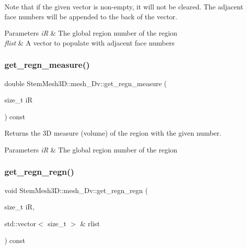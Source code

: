 Note that if the given vector is non-\/empty, it will not be cleared. The adjacent face numbers will be appended to the back of the vector. 
\begin{DoxyParams}{Parameters}
{\em iR} & The global region number of the region \\
\hline
{\em flist} & A vector to populate with adjacent face numbers \\
\hline
\end{DoxyParams}
\mbox{\label{classStemMesh3D_1_1mesh__3Dv_a1c784e3ea324d11e1ebd51574dcaabde}} 
\subsubsection{\texorpdfstring{get\+\_\+regn\+\_\+measure()}{get\_regn\_measure()}}
{\footnotesize\ttfamily double Stem\+Mesh3\+D\+::mesh\+\_\+Dv\+::get\+\_\+regn\+\_\+measure (\begin{DoxyParamCaption}\item[{size\+\_\+t}]{iR }\end{DoxyParamCaption}) const}



Returns the 3D measure (volume) of the region with the given number. 


\begin{DoxyParams}{Parameters}
{\em iR} & The global region number of the region \\
\hline
\end{DoxyParams}
\mbox{\label{classStemMesh3D_1_1mesh__3Dv_aae9d1d4fa2441cb2ac8e6a05f3e5038b}} 
\subsubsection{\texorpdfstring{get\+\_\+regn\+\_\+regn()}{get\_regn\_regn()}}
{\footnotesize\ttfamily void Stem\+Mesh3\+D\+::mesh\+\_\+Dv\+::get\+\_\+regn\+\_\+regn (\begin{DoxyParamCaption}\item[{size\+\_\+t}]{iR,  }\item[{std\+::vector$<$ size\+\_\+t $>$ \&}]{rlist }\end{DoxyParamCaption}) const}



